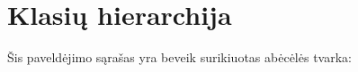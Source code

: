 \section{Klasių hierarchija}
Šis paveldėjimo sąrašas yra beveik surikiuotas abėcėlės tvarka\+:\begin{DoxyCompactList}
\item {}
\begin{DoxyCompactList}
\item {}
\end{DoxyCompactList}
\end{DoxyCompactList}
